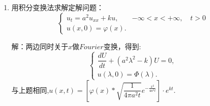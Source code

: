 \documentclass[11pt]{article}
\begin{document}
\begin{enumerate}
    \item  用积分变换法求解定解问题：
    \[
    \left\{
     \begin{array}{lr}
     u_{t}=a^2u_{xx}+ku,& -\infty<x<+\infty,\quad t>0 \\
     u(x,0)=\varphi(x).
     \end{array}
    \right. \]

    解：两边同时关于$x$做$Fourier$变换，得到:
        \begin{equation*}
        \left\{
         \begin{array}{lr}
             \dfrac{dU}{dt}+(a^2 \lambda^2-k)U=0,\\u(\lambda,0)=\Phi(\lambda).
         \end{array}
        \right.
     \end{equation*}
    与上题相同,$u(x,t)=[\varphi(x)\ast \sqrt {\dfrac{1}{4\pi a^2t}}e^{-\frac{x^2}{4a^2 t}}]\cdot e^{kt}$.

\end{enumerate}
\end{document}
